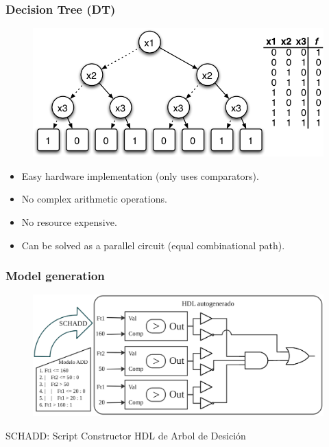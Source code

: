 \documentclass[
serif,
compress,
xcolor=table,
dvipsnames,
]{beamer}
\begin{document}
\begin{frame}
\frametitle{Decision Tree (DT)}
\begin{figure}[h]
    \centering
    \includegraphics[width=0.8\linewidth]{BDD.png}
    \label{overview}
\end{figure}

\small
\begin{itemize}
 \item Easy hardware implementation (only uses comparators).
 \item No complex arithmetic operations.
 \item No resource expensive.
 \item Can be solved as a parallel circuit (equal combinational path).
\end{itemize}


\end{frame}


\begin{frame}
	\frametitle{Model generation}
	
	\begin{figure}[h]
		\centering
		\includegraphics[width=0.9\linewidth]{F/addex}  
		\label{weki}
	\end{figure}
	
	SCHADD: Script Constructor HDL de Arbol de Desición
	
\end{frame}
\end{document}
